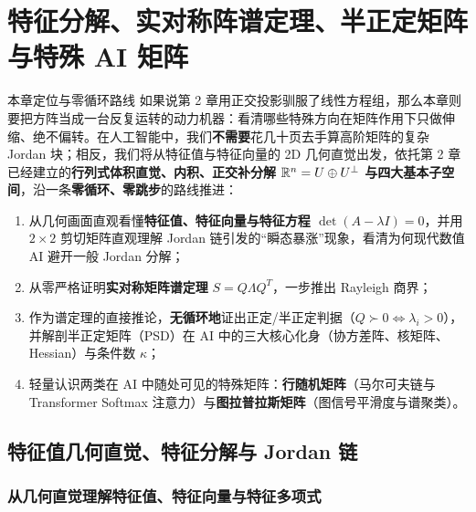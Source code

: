 \chapter[特征分解、谱定理与半正定矩阵]{特征分解、实对称阵谱定理、半正定矩阵与特殊 AI 矩阵}
\label{ch:ch3}


\begin{chapIntro}{本章定位与零循环路线}
如果说第 2 章用正交投影驯服了线性方程组，那么本章则要把方阵当成一台反复运转的动力机器：看清哪些特殊方向在矩阵作用下只做伸缩、绝不偏转。在人工智能中，我们\textbf{不需要}花几十页去手算高阶矩阵的复杂 Jordan 块；相反，我们将从特征值与特征向量的 2D 几何直觉出发，依托第 2 章已经建立的\textbf{行列式体积直觉、内积、正交补分解 $\mathbb{R}^n = U \oplus U^\perp$ 与四大基本子空间}，沿一条\textbf{零循环、零跳步}的路线推进：
\begin{enumerate}
  \item 从几何画面直观看懂\textbf{特征值、特征向量与特征方程 $\det(A-\lambda I)=0$}，并用 $2\times 2$ 剪切矩阵直观理解 Jordan 链引发的“瞬态暴涨”现象，看清为何现代数值 AI 避开一般 Jordan 分解；
  \item 从零严格证明\textbf{实对称矩阵谱定理} $S = Q\Lambda Q^T$，一步推出 Rayleigh 商界；
  \item 作为谱定理的直接推论，\textbf{无循环地}证出正定/半正定判据（$Q \succ 0 \iff \lambda_i > 0$），并解剖半正定矩阵（PSD）在 AI 中的三大核心化身（协方差阵、核矩阵、Hessian）与条件数 $\kappa$；
  \item 轻量认识两类在 AI 中随处可见的特殊矩阵：\textbf{行随机矩阵}（马尔可夫链与 Transformer Softmax 注意力）与\textbf{图拉普拉斯矩阵}（图信号平滑度与谱聚类）。
\end{enumerate}
\end{chapIntro}

\section{特征值几何直觉、特征分解与 Jordan 链}
\label{sec:ch3-eigen-jordan}

\subsection{从几何直觉理解特征值、特征向量与特征多项式}

